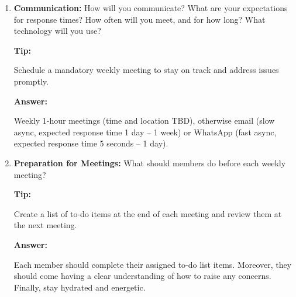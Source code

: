 \documentclass[12pt]{article}
\newenvironment{answer}[1][]{
  \color{blue}\textbf{Answer:}
}{}
\newenvironment{alice}[1][]{
  \color{black}\textbf{Tip:}
}{}
\begin{document}
\begin{enumerate}
\begin{answer}
Roles will include:
\begin{enumerate}
  \item Writers for the Project Proposal and Final Report
  \item Data Explorer: preparing the dataset, understanding the features at hand.
  \item Methodology Developer: developing the methodology including model families, optimization techniques, validation method, hyperparameters.
  \item Model Developer: implementing the model, validating, tuning hyperparameters, measuring performance.
\end{enumerate}

We are all eager to contribute to developing the model. We plan to divide other tasks as they arise, as we currently aren't sure about our relative strengths and weaknesses. For example, William is typing up this document because he likes \LaTeX.

\end{answer}

\item {\bf Communication:} How will you communicate? What are your expectations for response times? How often will you meet, and for how long? What technology will you use?

\begin{alice}

Schedule a mandatory weekly meeting to stay on track and address issues promptly.
\end{alice}

\begin{answer}
Weekly 1-hour meetings (time and location TBD), otherwise email (slow async, expected response time 1 day -- 1 week) or WhatsApp (fast async, expected response time 5 seconds -- 1 day).

\end{answer}

\item {\bf Preparation for Meetings:} What should members do before each weekly meeting?

\begin{alice}

Create a list of to-do items at the end of each meeting and review them at the next meeting.

\end{alice}

\begin{answer}
Each member should complete their assigned to-do list items. Moreover, they should come having a clear understanding of how to raise any concerns. Finally, stay hydrated and energetic.
\end{answer}



\end{enumerate}
\end{document}
